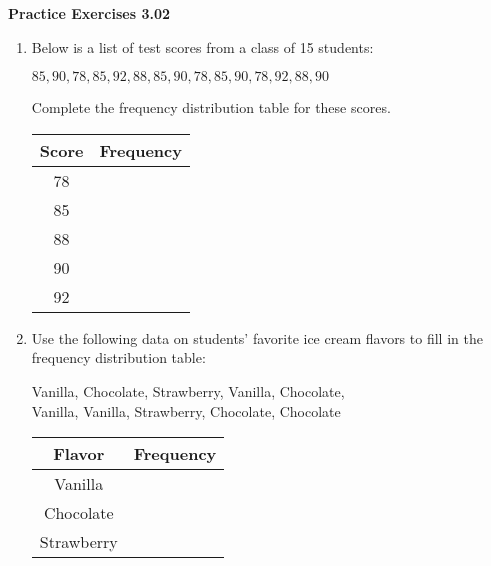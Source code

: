 \vspace{0.3ex}
\noindent\textbf{Practice Exercises 3.02}

\vspace{0.2ex}

\begin{enumerate}[noitemsep, label = \color{blue}\arabic*.]
\item Below is a list of test scores from a class of 15 students:
  
    {\centering $  85, 90, 78, 85, 92, 88, 85, 90, 78, 85, 90, 78, 92, 88, 90  $\par}

    Complete the frequency distribution table for these scores.

    \begin{center}
    \begin{tabular}{|c|c|}
    \hline
    \textbf{Score} & \textbf{Frequency} \\
    \hline
    78 & \\
    \hline
    85 & \\
    \hline
    88 & \\
    \hline
    90 & \\
    \hline
    92 & \\
    \hline
    \end{tabular}
    \end{center}

    \item Use the following data on students' favorite ice cream flavors to fill in the frequency distribution table:

    {\centering Vanilla, Chocolate, Strawberry, Vanilla, Chocolate,\\ Vanilla, Vanilla, Strawberry, Chocolate, Chocolate \par}

    \begin{center}
    \begin{tabular}{|c|c|}
    \hline
    \textbf{Flavor} & \textbf{Frequency} \\
    \hline
    Vanilla & \\
    \hline
    Chocolate & \\
    \hline
    Strawberry & \\
    \hline
    \end{tabular}
    \end{center}


\end{enumerate}
